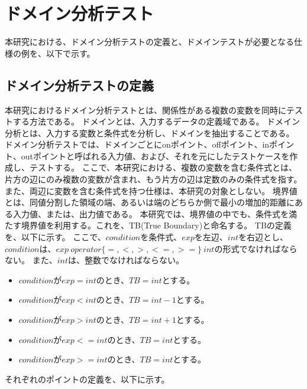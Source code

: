 \documentclass[uplatex, report, a4j, 10pt]{jsbook}
\begin{document}
\section{ドメイン分析テスト}\label{cha:domain}
本研究における、ドメイン分析テストの定義と、ドメインテストが必要となる仕様の例を、以下で示す。

\subsection{ドメイン分析テストの定義}\label{sec:define}
本研究におけるドメイン分析テストとは、関係性がある複数の変数を同時にテストする方法である\cite{izon}\cite{istqb}。
ドメインとは、入力するデータの定義域である。
ドメイン分析とは、入力する変数と条件式を分析し、ドメインを抽出することである。
ドメイン分析テストでは、ドメインごとにonポイント、offポイント、inポイント、outポイントと呼ばれる入力値、および、それを元にしたテストケースを作成し、テストする。
ここで、本研究における、複数の変数を含む条件式とは、片方の辺にのみ複数の変数が含まれ、もう片方の辺は定数のみの条件式を指す。
また、両辺に変数を含む条件式を持つ仕様は、本研究の対象としない。
境界値とは、同値分割した領域の端、あるいは端のどちらか側で最小の増加的距離にある入力値、または、出力値である\cite{istqb}。
本研究では、境界値の中でも、条件式を満たす境界値を利用する。これを、TB(True Boundary)と命名する。
TBの定義を、以下に示す。
ここで、$condition$を条件式、$exp$を左辺、$int$を右辺とし、
$condition$は、$exp \: operator\{=, <, >, <=, >=\} \: int$の形式でなければならない。
また、$int$は、整数でなければならない。
\begin{itemize}
  \item $condition$が$exp = int$のとき、$TB = int$とする。
  \item $condition$が$exp < int$のとき、$TB = int - 1$とする。
  \item $condition$が$exp > int$のとき、$TB = int + 1$とする。
  \item $condition$が$exp <= int$のとき、$TB = int$とする。
  \item $condition$が$exp >= int$のとき、$TB = int$とする。
\end{itemize}
それぞれのポイントの定義を、以下に示す。
\end{document}
